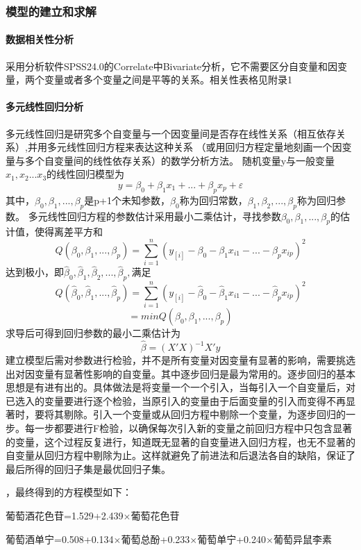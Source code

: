 \documentclass[UTF8,12.05pt]{ctexart}
\begin{document}
\subsubsection{\heiti{}模型的建立和求解}
\paragraph{数据相关性分析}
采用分析软件SPSS24.0的Correlate中Bivariate分析，它不需要区分自变量和因变量，两个变量或者多个变量之间是平等的关系。相关性表格见附录1
\paragraph{多元线性回归分析}
多元线性回归是研究多个自变量与一个因变量间是否存在线性关系（相互依存关系）,并用多元线性回归方程来表达这种关系 （或用回归方程定量地刻画一个因变量与多个自变量间的线性依存关系）的数学分析方法。
随机变量y与一般变量$x_{1},x_{2}...x_{3}$的线性回归模型为
$$y=\beta_{0}+\beta_{1}x_{1}+...+\beta_{p}x_{p}+\varepsilon$$
其中，$\beta_{0},\beta_{1},...,\beta_{p}$是p+1个未知参数，$\beta_{0}$称为回归常数，$\beta_{1},\beta_{2},...,\beta_{p}$称为回归参数。
多元线性回归方程的参数估计采用最小二乘估计，寻找参数$\beta_{0},\beta_{1},...
,\beta_{p}$的估计值，使得离差平方和
$$Q(\beta_{0},\beta_{1},...,\beta_{p})=\sum_{i=1}^{n}(y_[i]-\beta_{0}-\beta_{1}x_{i1}-...-\beta_{p}x_{ip})^{2}$$
达到极小，即$\hat{\beta}_{0},\hat{\beta}_{1},\hat{\beta}_{2},...,
\hat{\beta}_{p},$满足
$$Q(\hat{\beta}_{0},\hat{\beta}_{1},...,\hat{\beta}_{p})=\sum_{i=1}^{n}(y_[i]-\hat{\beta}_{0}-\hat{\beta}_{1}x_{i1}-...-\hat{\beta}_{p}x_{ip})^{2}$$
  $$ =minQ(\beta_{0},\beta_{1},...,\beta_{p})$$
求导后可得到回归参数的最小二乘估计为
$$\hat{\beta}=(X'X)^{-1}X'y$$
建立模型后需对参数进行检验，并不是所有变量对因变量有显著的影响，需要挑选出对因变量有显著性影响的自变量。其中逐步回归是最为常用的。逐步回归的基本思想是有进有出的。具体做法是将变量一个一个引入，当每引入一个自变量后，对已选入的变量要进行逐个检验，当原引入的变量由于后面变量的引入而变得不再显著时，要将其剔除。引入一个变量或从回归方程中剔除一个变量，为逐步回归的一步。每一步都要进行F检验，以确保每次引入新的变量之前回归方程中只包含显著的变量，这个过程反复进行，知道既无显著的自变量进入回归方程，也无不显著的自变量从回归方程中剔除为止。这样就避免了前进法和后退法各自的缺陷，保证了最后所得的回归子集是最优回归子集。

，最终得到的方程模型如下：

葡萄酒花色苷=1.529+2.439$\times$葡萄花色苷

葡萄酒单宁=0.508+0.134$\times$葡萄总酚+0.233$\times$葡萄单宁+0.240$\times$葡萄异鼠李素
\end{document}

